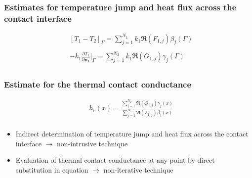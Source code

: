 \documentclass[aspectratio=169]{beamer}
\begin{document}
\begin{frame}
	\frametitle{Estimates for temperature jump and heat flux across the contact interface}
	\begin{alertblock}{}
		\begin{align*}
		& [T_1 - T_2]_\Gamma = \sum_{j=1}^{N_1} k_1 \Re(F_{1,j}) \beta_j(\Gamma) \\ \\
		& - k_1 \frac{\partial T_1}{\partial\mathbf{n_1}}\bigg|_\Gamma = \sum_{j=1}^{N_2} k_1 \Re(G_{1,j}) \gamma_j(\Gamma) \\
		\end{align*}
	\end{alertblock}
\end{frame}
%
\begin{frame}
	\frametitle{Estimate for the thermal contact conductance}
	\begin{alertblock}{}
		\begin{align*}
		& h_c(x) %
		= \frac{\displaystyle\sum_{j=1}^{N_2} \Re(G_{1,j}) \gamma_j(x)}{\displaystyle\sum_{j=1}^{N_1} \Re(F_{1,j}) \beta_j(x)} \\
		\end{align*}
	\end{alertblock}
	
	\begin{itemize}
		\item Indirect determination of temperature jump and heat flux across the contact interface $\rightarrow$ non-intrusive technique
		\item Evaluation of thermal contact conductance at any point by direct substitution in equation $\rightarrow$ non-iterative technique
	\end{itemize}
\end{frame}
\end{document}

